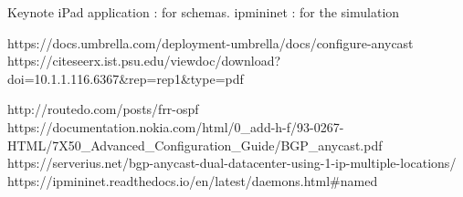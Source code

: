 \documentclass[letter, 9pt, conference]{ieeeconf}
\begin{document}



\begin{thebibliography}{99}

 Keynote iPad application : for schemas. 
 ipmininet : for the simulation

 https://docs.umbrella.com/deployment-umbrella/docs/configure-anycast
 https://citeseerx.ist.psu.edu/viewdoc/download?doi=10.1.1.116.6367&rep=rep1&type=pdf

 http://routedo.com/posts/frr-ospf
 https://documentation.nokia.com/html/0\_add-h-f/93-0267-HTML/7X50\_Advanced\_Configuration\_Guide/BGP\_anycast.pdf
 https://serverius.net/bgp-anycast-dual-datacenter-using-1-ip-multiple-locations/
 https://ipmininet.readthedocs.io/en/latest/daemons.html#named


\end{thebibliography}
\end{document}
